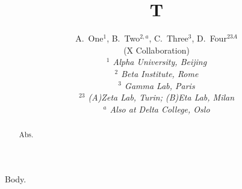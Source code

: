 \documentclass[aps,prd,superscriptaddress]{revtex4-1}
\begin{document}
\title{T}
\author{
		\begin{center}
	A.~One$^{1}$, B.~Two$^{2,a}$, C.~Three$^{3}$, D.~Four$^{23A}$
	\\
		\vspace{0.2cm}
		(X Collaboration)\\
		\vspace{0.2cm} {\it
	$^{1}$ Alpha University, Beijing\\$^{2}$ Beta Institute, Rome\\$^{3}$ Gamma Lab, Paris\\$^{23}$ (A)Zeta Lab, Turin; (B)Eta Lab, Milan\\
		\vspace{0.2cm}
		$^{a}$ Also at Delta College, Oslo\\
		}\end{center}
		\vspace{0.4cm}
}
\begin{abstract}Abs.\end{abstract}
\maketitle
Body.
\end{document}
